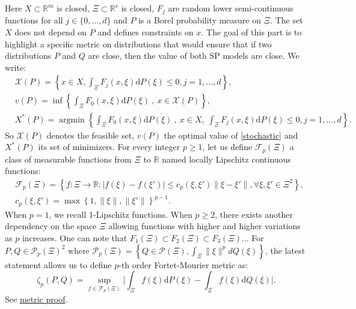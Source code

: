 \documentclass{amsart}
\newcommand{\argmin}{\mathop{\arg\min}}
\newcommand{\RR}{\mathbb{R}}
\begin{document}
Here $X\subset\RR^m$ is closed, $\Xi\subset\RR^s$ is closed, $F_j$ are random lower semi-continuous functions for all $j\in\{0,...,d\}$ and $P$ is a Borel probability measure on $\Xi$. The set $X$ does not depend on $P$ and defines constraints on $x$. The goal of this part is to highlight a specific metric on distributions that would ensure that if two distributions $P$ and $Q$ are close, then the value of both SP models are close. We write:
\begin{align*}
    &\mathcal{X}\left(P\right)=\left\{x\in X, \int_\Xi F_j\left(x,\xi\right)\text{d}P\left(\xi\right)\leq0, j=1,...,d\right\},\\
    &v\left(P\right)=\inf\left\{\int_\Xi F_0\left(x,\xi\right)\text{d}P\left(\xi\right)\:,\: x\in \mathcal{X}\left(P\right)\right\}, \\
    &X^*\left(P\right)=\argmin\left\{\int_\Xi F_0\left(x,\xi\right)\text{d}P\left(\xi\right)\:,\: x\in X, \: \int_\Xi F_j\left(x,\xi\right)\text{d}P\left(\xi\right)\leq0, j=1,...,d\right\}.
\end{align*}
So $\mathcal{X}\left(P\right)$ denotes the feasible set, $v\left(P\right)$ the optimal value of \eqref{stochastic} and $X^*\left(P\right)$ its set of minimizers. For every integer $p\geq 1$, let us define $\mathcal{F}_p\left(\Xi\right)$ a class of measurable functions from $\Xi$ to $\RR$ named locally Lipschitz continuous functions:
\begin{align*}
    &\mathcal{F}_p\left(\Xi\right)=\left\{f:\Xi\to \RR: \lvert f\left(\xi\right)-f\left(\xi'\right)\rvert \leq c_p\left(\xi,\xi'\right)\lVert\xi-\xi'\rVert, \forall \xi,\xi'\in \Xi^2 \right\}, \\
   & c_p\left(\xi,\xi'\right)=\max \left\{1,\lVert\xi \rVert,\lVert\xi'\rVert\right\}^{p-1}.
\end{align*}
When $p=1$, we recall 1-Lipschitz functions. When $p\geq 2$, there exists another dependency on the space $\Xi$ allowing functions with higher and higher variations as $p$ increases. One can note that $F_1\left(\Xi\right)\subset F_2\left(\Xi\right)\subset F_3\left(\Xi\right) \hdots$ For $P,Q\in\mathcal{P}_p\left(\Xi\right)^2$ where $\mathcal{P}_p\left(\Xi\right)=\left\{Q\in\mathcal{P}\left(\Xi\right), \int_\Xi \lVert\xi\rVert^pdQ\left(\xi\right)\right\}$, the latest statement allows us to define $p$-th order Fortet-Mourier metric as:
$$
\zeta_p\left(P,Q\right)=\sup_{f\in\mathcal{F}_p\left(\Xi\right)}\lvert \int_\Xi f\left(\xi\right)\text{d}P\left(\xi\right)-\int_\Xi f\left(\xi\right)\text{d}Q\left(\xi\right)\rvert.
$$
See \href{https://www.imo.universite-paris-saclay.fr/~pierre-loic.meliot/master/exam-2017.pdf}{metric proof}.
\end{document}
